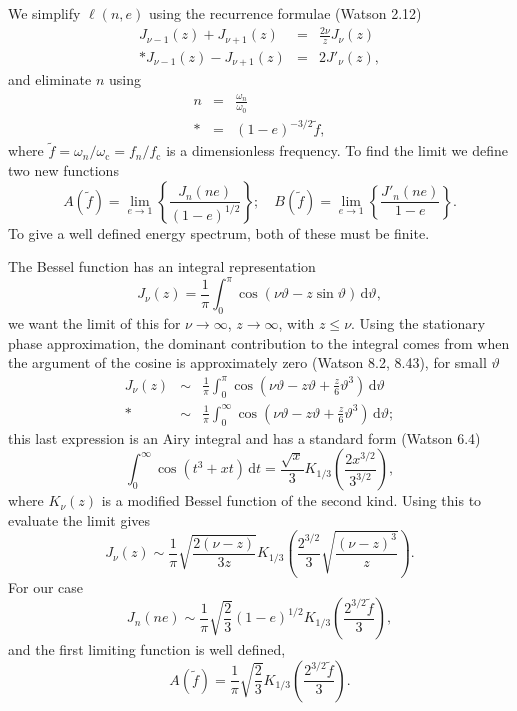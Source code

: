 \documentclass[aps,prd,amsfonts,amssymb,amsmath,reprint,showpacs,groupedaddress]{revtex4-1}
\newcommand{\sub}[1]{\ensuremath{_\text{#1}}}
\newcommand{\dd}{\ensuremath{\mathrm{d}}}
\newcommand{\intd}[4]{\ensuremath{\int_{#1}^{#2}{#3}\,\dd{#4}}}
\newcommand{\recip}[1]{\ensuremath{\frac{1}{#1}}}
\begin{document}
We simplify $\ell(n,e)$ using the recurrence formulae (Watson\cite{Watson1995} 2.12)
\begin{eqnarray}
J_{\nu-1}(z) + J_{\nu+1}(z) & = & \frac{2\nu}{z}J_\nu(z)\\*
J_{\nu-1}(z) - J_{\nu+1}(z) & = & 2J'_\nu(z),\label{eq:J_derivative}
\end{eqnarray}
and eliminate $n$ using
\begin{eqnarray}
n & = & \frac{\omega_n}{\omega_0} \nonumber \\*
& = & (1-e)^{-3/2}\tilde{f},
\end{eqnarray}
where $\tilde{f} = \omega_n/\omega\sub{c} = f_n/f\sub{c}$ is a dimensionless frequency. To find the limit we define two new functions
\begin{equation}
A(\tilde{f}) = \lim_{e\rightarrow 1}\left\{\frac{J_n(ne)}{(1-e)^{1/2}}\right\}; \quad B(\tilde{f}) = \lim_{e\rightarrow 1}\left\{\frac{J'_n(ne)}{1-e}\right\}.
\end{equation}
To give a well defined energy spectrum, both of these must be finite.

The Bessel function has an integral representation
\begin{equation}
J_\nu(z) = \recip{\pi}\intd{0}{\pi}{\cos(\nu\vartheta - z\sin\vartheta)}{\vartheta},
\end{equation}
we want the limit of this for $\nu \rightarrow \infty$, $z \rightarrow \infty$, with $z \leq \nu$. Using the stationary phase approximation, the dominant contribution to the integral comes from when the argument of the cosine is approximately zero (Watson\cite{Watson1995} 8.2, 8.43), for small $\vartheta$
\begin{eqnarray}
J_\nu(z) & \sim & \recip{\pi}\intd{0}{\pi}{\cos\left(\nu\vartheta - z\vartheta + \frac{z}{6}\vartheta^3\right)}{\vartheta}\\*
 & \sim & \recip{\pi}\intd{0}{\infty}{\cos\left(\nu\vartheta - z\vartheta + \frac{z}{6}\vartheta^3\right)}{\vartheta};
\end{eqnarray}
this last expression is an Airy integral and has a standard form (Watson\cite{Watson1995} 6.4)
\begin{equation}
\intd{0}{\infty}{\cos(t^3 + xt)}{t} = \frac{\sqrt{x}}{3}K_{1/3}\left(\frac{2x^{3/2}}{3^{3/2}}\right),
\end{equation}
where $K_\nu(z)$ is a modified Bessel function of the second kind. Using this to evaluate the limit gives
\begin{equation}
J_\nu(z) \sim \recip{\pi}\sqrt{\frac{2(\nu - z)}{3z}}K_{1/3}\left(\frac{2^{3/2}}{3}\sqrt{\frac{(\nu -z)^3}{z}}\right).
\label{eq:J_nu}
\end{equation}
For our case
\begin{equation}
J_n(ne) \sim \recip{\pi}\sqrt{\frac{2}{3}}(1-e)^{1/2}K_{1/3}\left(\frac{2^{3/2}\tilde{f}}{3}\right),
\end{equation}
and the first limiting function is well defined,
\begin{equation}
A(\tilde{f}) = \recip{\pi}\sqrt{\frac{2}{3}}K_{1/3}\left(\frac{2^{3/2}\tilde{f}}{3}\right).
\end{equation}
\end{document}
